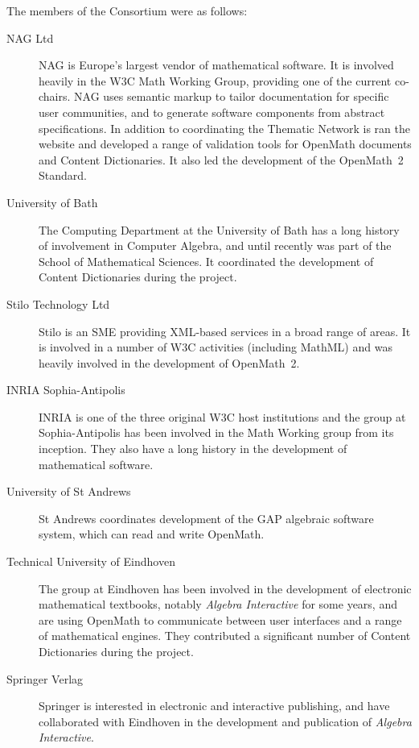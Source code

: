 The members of the Consortium were as follows:
\begin{description}

\item[NAG Ltd] NAG is Europe's largest vendor of mathematical software.
It is involved heavily in the W3C Math Working Group, providing one of
the current co-chairs.  NAG uses semantic markup to tailor documentation
for specific user communities, and to generate software components from
abstract specifications.  In addition to coordinating the Thematic
Network is ran the website and developed a range of validation tools for
OpenMath documents and Content Dictionaries.  It also led the
development of the OpenMath~2 Standard.

\item[University of Bath] The Computing Department at the University of
Bath has a long history of involvement in Computer Algebra, and until
recently was part of the School of Mathematical Sciences.  It
coordinated the development of Content Dictionaries during the project.

\item[Stilo Technology Ltd] Stilo is an SME providing XML-based services
in a broad range of areas.   It is involved in a number of W3C
activities (including MathML) and was heavily involved in the
development of OpenMath~2.

\item[INRIA Sophia-Antipolis] INRIA is one of the three original W3C
host institutions and the group at Sophia-Antipolis has been involved in
the Math Working group from its inception.  They also have a long
history in the development of mathematical software.

\item[University of St Andrews] St Andrews coordinates development of
the GAP algebraic software system, which can read and write OpenMath.
  
\item[Technical University of Eindhoven] The group at Eindhoven has been
involved in the development of electronic mathematical textbooks,
notably \emph{Algebra Interactive} for some years, and are using
OpenMath to communicate between user interfaces and a range of
mathematical engines.  They contributed a significant number of Content
Dictionaries during the project.

\item[Springer Verlag] Springer is interested in electronic and
interactive publishing, and have collaborated with Eindhoven in the
development and publication of \emph{Algebra Interactive}.
 

\end{description}
